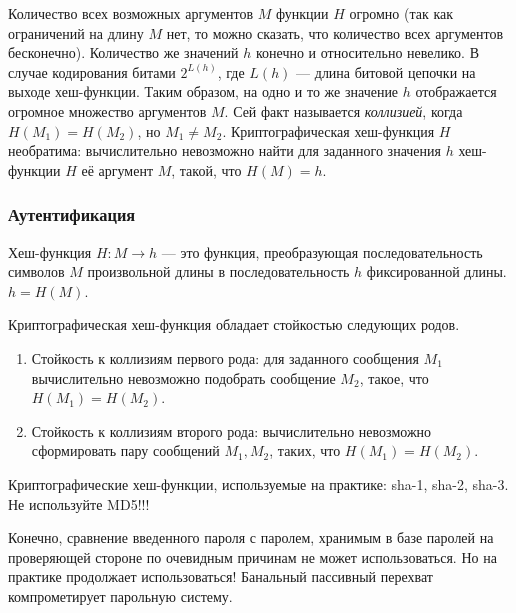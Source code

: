 Количество всех возможных аргументов $M$ функции $H$ огромно (так как ограничений на длину $M$ нет, то можно сказать, что количество всех аргументов бесконечно). Количество же значений $h$ конечно и относительно невелико. В случае кодирования битами $2^{L(h)}$, где $L(h)$ --- длина битовой цепочки на выходе хеш-функции. Таким образом, на одно и то же значение $h$ отображается огромное множество аргументов $M$. Сей факт называется \emph{коллизией}, когда $H(M_1 )=H(M_2)$, но $M_1\neq M_2$.
Криптографическая хеш-функция $H$ необратима: вычислительно невозможно найти для заданного значения $h$ хеш-функции $H$ её аргумент $M$, такой, что $H(M)=h$.

\begin{frame}
\frametitle{Аутентификация}
\begin{definition}%
\alert{Хеш-функция} $H:M\rightarrow h$ --- это функция, преобразующая последовательность символов $M$ произвольной длины в последовательность $h$ фиксированной длины. $h=H(M)$.
\end{definition}
\alert{Криптографическая} хеш-функция обладает стойкостью следующих родов.
\begin{enumerate}
    \item Стойкость к коллизиям \alert{первого} рода: для заданного сообщения $M_1$ вычислительно невозможно подобрать сообщение $M_2$, такое, что $H(M_1)=H(M_2)$.
    \item Стойкость к коллизиям \alert{второго} рода: вычислительно невозможно сформировать пару сообщений $M_1,M_2$, таких, что $H(M_1)=H(M_2)$.
\end{enumerate}
\end{frame}

Криптографические хеш-функции, используемые на практике: sha-1, sha-2, sha-3. Не используйте MD5!!!

Конечно, сравнение введенного пароля с паролем, хранимым в базе паролей на проверяющей стороне по очевидным причинам не может использоваться. Но на практике продолжает использоваться! Банальный пассивный перехват компрометирует парольную систему.

